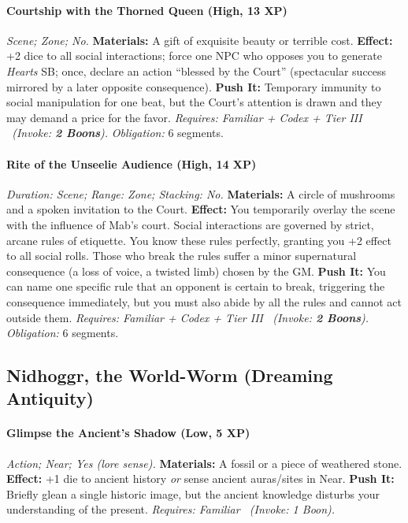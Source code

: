 \paragraph{Courtship with the Thorned Queen (High, 13 XP)} \emph{Scene; Zone; No.}
\textbf{Materials:} A gift of exquisite beauty or terrible cost.
\textbf{Effect:} +2 dice to all social interactions; force one NPC who opposes you to generate \emph{Hearts} SB; once, declare an action ``blessed by the Court'' (spectacular success mirrored by a later opposite consequence).
\textbf{Push It:} Temporary immunity to social manipulation for one beat, but the Court's attention is drawn and they may demand a price for the favor.
\emph{Requires: Familiar + Codex + Tier III \ (\textit{Invoke:} \textbf{2 Boons}).}
\emph{Obligation:} 6 segments.

\paragraph{Rite of the Unseelie Audience (High, 14 XP)} \emph{Duration: Scene; Range: Zone; Stacking: No.}
\textbf{Materials:} A circle of mushrooms and a spoken invitation to the Court.
\textbf{Effect:} You temporarily overlay the scene with the influence of Mab's court. Social interactions are governed by strict, arcane rules of etiquette. You know these rules perfectly, granting you +2 effect to all social rolls. Those who break the rules suffer a minor supernatural consequence (a loss of voice, a twisted limb) chosen by the GM.
\textbf{Push It:} You can name one specific rule that an opponent is certain to break, triggering the consequence immediately, but you must also abide by all the rules and cannot act outside them.
\emph{Requires: Familiar + Codex + Tier III \ (\textit{Invoke:} \textbf{2 Boons}).}
\emph{Obligation:} 6 segments.

\subsection{Nidhoggr, the World-Worm (Dreaming Antiquity)}
\paragraph{Glimpse the Ancient's Shadow (Low, 5 XP)} \emph{Action; Near; Yes (lore sense).}
\textbf{Materials:} A fossil or a piece of weathered stone.
\textbf{Effect:} +1 die to ancient history \emph{or} sense ancient auras/sites in Near.
\textbf{Push It:} Briefly glean a single historic image, but the ancient knowledge disturbs your understanding of the present.
\emph{Requires: Familiar \ (\textit{Invoke:} 1 Boon).}
